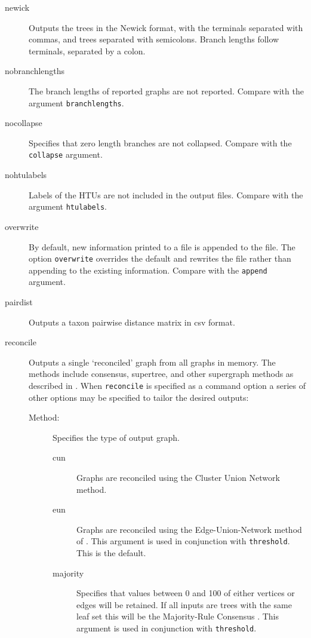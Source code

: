 \begin{description}
		\item[newick] Outputs the trees in the Newick format, with the terminals
		separated with commas, and trees separated with semicolons. Branch
		lengths follow terminals, separated by a colon.
		
		\item[nobranchlengths] The branch lengths of reported graphs are not 
		reported. Compare with the argument \texttt{branchlengths}.
		
		\item[nocollapse] Specifies that zero length branches are not collapsed. 
		Compare with the \texttt{collapse} argument.
		
		\item[nohtulabels] Labels of the HTUs are not included in the output files. 
		Compare with the argument \texttt{htulabels}.
		
		\item[overwrite] By default, new information printed to a file is appended 
		to the file. The option \texttt{overwrite} overrides the default and rewrites 
		the file rather than appending to the existing information. Compare with 
		the \texttt{append} argument.

		\item[pairdist] Outputs a taxon pairwise distance matrix in csv format. 
		
		\item[reconcile] Outputs a single `reconciled' graph from all graphs in 
		memory. The methods include consensus, supertree, and other supergraph 
		methods as described in \cite{Wheeler2012, Wheeler2022}. When \texttt{reconcile} 
		is specified as a command option a series of other options may be specified 
		to tailor the desired outputs:
		
			\begin{description}
			\item [Method:] Specifies the type of output graph. 
			
				\begin{description}
				\item[cun] Graphs are reconciled using the Cluster Union Network 
				\citep{Baroni2005} method.
				
				\item[eun] Graphs are reconciled using the Edge-Union-Network method of 
				\citep{MiyagiandWheeler2019}. This argument is used in conjunction with 
				\texttt{threshold}. This is the default.
				
				\item[majority] Specifies that values between 0 and 100 of either vertices or 
				edges will be retained. If all inputs are trees with the same leaf set this will 
				be the Majority-Rule Consensus \citep{MargushandMcMorris1981}. This
				argument is used in conjunction with \texttt{threshold}.


\end{description}
\end{description}
\end{description}
